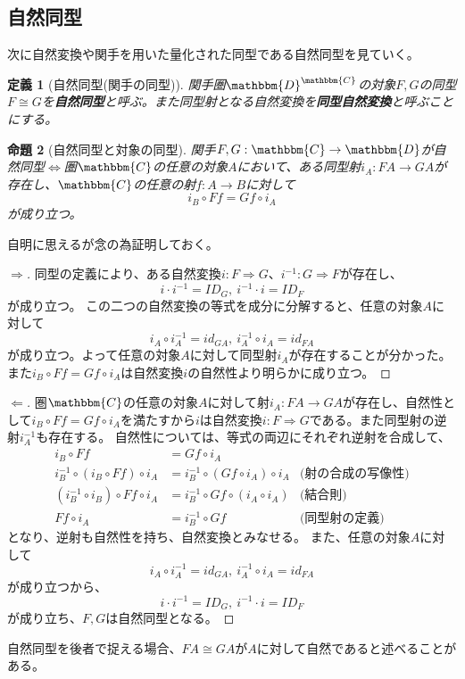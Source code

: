 \documentclass[uplatex,dvipdfmx]{jsarticle}
\newcommand{\cat}[1]{\mathbbm{#1}}
\newcommand{\arrow}{\rightarrow}
\newcommand{\functor}[3]{#1:\cat{#2}\arrow \cat{#3}}
\newcommand{\nat}[3]{#1:#2\Rightarrow #3}
\newcommand{\mor}[3]{#1:#2\arrow #3}
\newcommand{\funccat}[2]{\cat{#2}^\cat{#1}}
\newtheorem{proof}{証明}[section]
\newtheorem{prop}[proof]{命題}
\newtheorem{define}[proof]{定義}
\numberwithin{proof}{subsection}
\begin{document}
	\subsection{自然同型}
  次に自然変換や関手を用いた量化された同型である自然同型を見ていく。
  \begin{define}[自然同型(関手の同型)]
    関手圏$\funccat{C}{D}$の対象$F,G$の同型$F\cong G$を\textbf{自然同型}と呼ぶ。また同型射となる自然変換を\textbf{同型自然変換}と呼ぶことにする。
  \end{define}
  \begin{prop}[自然同型と対象の同型]
    関手$\functor{F,G}{C}{D}$が自然同型$\iff$圏$\cat{C}$の任意の対象$A$において、ある同型射$\mor{i_A}{FA}{GA}$が存在し、$\cat{C}$の任意の射$\mor{f}{A}{B}$に対して\[i_B\circ Ff=Gf\circ i_A\]が成り立つ。
  \end{prop}
  自明に思えるが念の為証明しておく。
  \begin{proof}[$\Longrightarrow$]
    同型の定義により、ある自然変換$\nat{i}{F}{G}$、$\nat{i^{-1}}{G}{F}$が存在し、\[i\cdot i^{-1}=ID_G,\ i^{-1}\cdot i=ID_F\]が成り立つ。
    この二つの自然変換の等式を成分に分解すると、任意の対象$A$に対して\[i_A\circ i^{-1}_A=id_{GA},\ i^{-1}_A\circ i_A=id_{FA}\]が成り立つ。よって任意の対象$A$に対して同型射$i_A$が存在することが分かった。
    また$i_B\circ Ff=Gf\circ i_A$は自然変換$i$の自然性より明らかに成り立つ。
  \end{proof}
  \begin{proof}[$\Longleftarrow$]
    圏$\cat{C}$の任意の対象$A$に対して射$\mor{i_A}{FA}{GA}$が存在し、自然性として$i_B\circ Ff=Gf\circ i_A$を満たすから$i$は自然変換$\nat{i}{F}{G}$である。また同型射の逆射$i^{-1}_A$も存在する。
    自然性については、等式の両辺にそれぞれ逆射を合成して、
    \begin{align*}
      i_B\circ Ff &=Gf\circ i_A\\
      i^{-1}_B\circ (i_B\circ Ff)\circ i_A &=i^{-1}_B\circ(Gf\circ i_A)\circ i_A&\text{(射の合成の写像性)}\\
      (i^{-1}_B\circ i_B)\circ Ff\circ i_A &=i^{-1}_B\circ Gf\circ (i_A\circ i_A)&\text{(結合則)}\\
      Ff\circ i_A&=i^{-1}_B\circ Gf&\text{(同型射の定義)}
    \end{align*}
    となり、逆射も自然性を持ち、自然変換とみなせる。
    また、任意の対象$A$に対して\[i_A\circ i^{-1}_A=id_{GA},\ i^{-1}_A\circ i_A=id_{FA}\]が成り立つから、\[i\cdot i^{-1}=ID_G,\ i^{-1}\cdot i=ID_F\]が成り立ち、$F,G$は自然同型となる。
  \end{proof}
  自然同型を後者で捉える場合、$FA\cong GA$が$A$に対して自然であると述べることがある。
\end{document}
